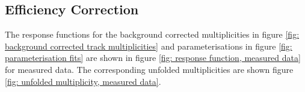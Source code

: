 \subsection{Efficiency Correction}
\label{subsection: charged particle multiplicity, efficiency correction}





The response functions for the background corrected multiplicities in figure \ref{fig: background corrected track multiplicities} and parameterisations in figure \ref{fig: parameterisation fits} are shown in figure \ref{fig: response function, measured data} for measured data. The corresponding unfolded multiplicities are shown figure \ref{fig: unfolded multiplicity, measured data}.

